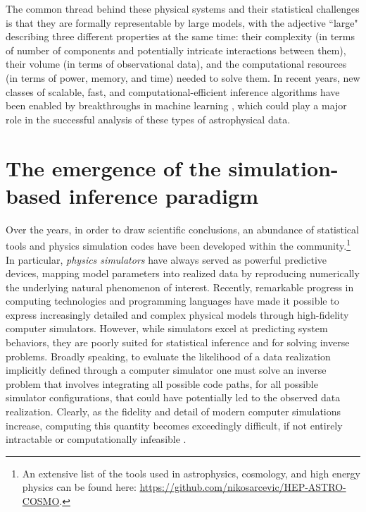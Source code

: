 \vspace{0.3cm} 
The common thread behind these physical systems and their statistical challenges is that they are formally representable by large models, with the adjective ``large" describing three different properties at the same time: their complexity (in terms of number of components and potentially intricate interactions between them), their volume (in terms of observational data), and the computational resources (in terms of power, memory, and time) needed to solve them. In recent years, new classes of scalable, fast, and computational-efficient inference algorithms have been enabled by breakthroughs in machine learning \cite{Murphy:book}, which could play a major role in the successful analysis of these types of astrophysical data.


\section{The emergence of the simulation-based inference paradigm} \label{sec:paradigm}

Over the years, in order to draw scientific conclusions, an abundance of statistical tools and physics simulation codes have been developed within the community.\footnote{An extensive list of the tools used in astrophysics, cosmology, and high energy physics can be found here: \url{https://github.com/nikosarcevic/HEP-ASTRO-COSMO}.}
In particular, \emph{physics simulators} have always served as powerful predictive devices, mapping model parameters into realized data by reproducing numerically the underlying natural phenomenon of interest.
Recently, remarkable progress in computing technologies and programming languages have made it possible to express increasingly detailed and complex physical models through high-fidelity computer simulators. However, while simulators excel at predicting system behaviors, they are poorly suited for statistical inference and for solving inverse problems. 
Broadly speaking, to evaluate the likelihood of a data realization implicitly defined through a computer simulator one must solve an inverse problem that involves integrating all possible code paths, for all possible simulator configurations, that could have potentially led to the observed data realization. Clearly, as the fidelity and detail of modern computer simulations increase, computing this quantity becomes exceedingly difficult, if not entirely intractable or computationally infeasible  \cite{Cranmer:2019eaq}. 

